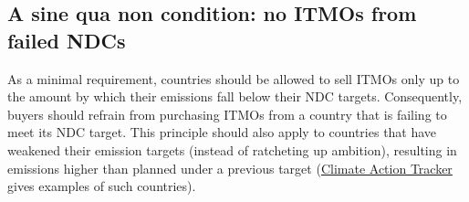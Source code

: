 \documentclass[12pt,english]{article}
\begin{document}
\subsection{A sine qua non condition: no ITMOs from failed NDCs} %
As a minimal requirement, countries should be allowed to sell ITMOs only up to the amount by which their emissions fall below their NDC targets. Consequently, buyers should refrain from purchasing ITMOs from a country that is failing to meet its NDC target. %
This principle should also apply to countries that have weakened their emission targets (instead of ratcheting up ambition), resulting in emissions higher than planned under a previous target (\href{https://climateactiontracker.org/climate-target-update-tracker/list-non-updating-countries/}{Climate Action Tracker} gives examples of such countries).
\end{document}
